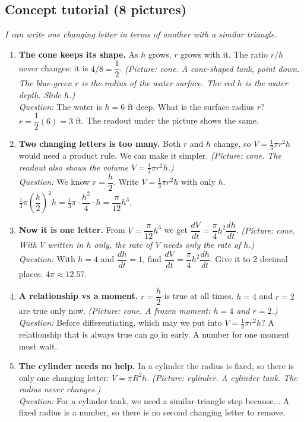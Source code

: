 \documentclass[11pt]{article}
\begin{document}
\subsection*{Concept tutorial (8 pictures)}
\textit{I can write one changing letter in terms of another with a similar triangle.}\par
\begin{enumerate}
\item \textbf{The cone keeps its shape.} As $h$ grows, $r$ grows with it. The ratio $r/h$ never changes: it is $4/8=\dfrac12$. \textit{(Picture: cone. A cone-shaped tank, point down. The blue-green $r$ is the radius of the water surface. The red $h$ is the water depth. Slide $h$.)}\\ \textit{Question:} The water is $h=6$ ft deep. What is the surface radius $r$?  $r=\dfrac12(6)=3$ ft. The readout under the picture shows the same.
\item \textbf{Two changing letters is too many.} Both $r$ and $h$ change, so $V=\tfrac13\pi r^2h$ would need a product rule. We can make it simpler. \textit{(Picture: cone. The readout also shows the volume $V=\tfrac13\pi r^2h$.)}\\ \textit{Question:} We know $r=\dfrac h2$. Write $V=\tfrac13\pi r^2h$ with only $h$.  $\tfrac13\pi\left(\dfrac h2\right)^2h=\tfrac13\pi\cdot\dfrac{h^2}{4}\cdot h=\dfrac{\pi}{12}h^3$.
\item \textbf{Now it is one letter.} From $V=\dfrac{\pi}{12}h^3$ we get $\dfrac{dV}{dt}=\dfrac{\pi}{4}h^2\dfrac{dh}{dt}$. \textit{(Picture: cone. With $V$ written in $h$ only, the rate of $V$ needs only the rate of $h$.)}\\ \textit{Question:} With $h=4$ and $\dfrac{dh}{dt}=1$, find $\dfrac{dV}{dt}=\dfrac{\pi}{4}h^2\dfrac{dh}{dt}$. Give it to 2 decimal places.  $4\pi\approx12.57$.
\item \textbf{A relationship vs a moment.} $r=\dfrac h2$ is true at all times. $h=4$ and $r=2$ are true only now. \textit{(Picture: cone. A frozen moment: $h=4$ and $r=2$.)}\\ \textit{Question:} Before differentiating, which may we put into $V=\tfrac13\pi r^2h$?  A relationship that is always true can go in early. A number for one moment must wait.
\item \textbf{The cylinder needs no help.} In a cylinder the radius is fixed, so there is only one changing letter: $V=\pi R^2h$. \textit{(Picture: cylinder. A cylinder tank. The radius never changes.)}\\ \textit{Question:} For a cylinder tank, we need a similar-triangle step because...  A fixed radius is a number, so there is no second changing letter to remove.

\end{enumerate}
\end{document}
